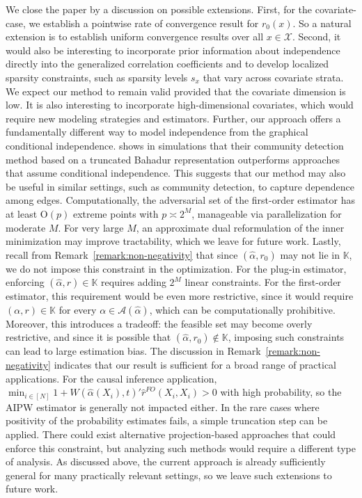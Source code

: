 \documentclass[11pt]{article}
\begin{document}
We close the paper by a discussion on possible extensions. First, for the covariate-case, we establish a pointwise rate of convergence result for $r_0(x)$. So a natural extension is to establish uniform convergence results over all $x\in\mathcal{X}$. Second, it would also be interesting to incorporate prior information about independence directly into the generalized correlation coefficients and to develop localized sparsity constraints, such as sparsity levels $s_x$ that vary across covariate strata. We expect our method to remain valid provided that the covariate dimension is low. It is also interesting to incorporate high-dimensional covariates, which would require new modeling strategies and estimators. Further, our approach offers a fundamentally different way to model independence from the graphical conditional independence. \citet{yuan2021community} shows in simulations that their community detection method based on a truncated Bahadur representation outperforms approaches that assume conditional independence. This suggests that our method may also be useful in similar settings, such as community detection, to capture dependence among edges. Computationally, the adversarial set of the first-order estimator has at least $\mathrm{O}(p)$ extreme points with $p\asymp2^M$, manageable via parallelization for moderate $M$. For very large $M$, an approximate dual reformulation of the inner minimization may improve tractability, which we leave for future work. Lastly, recall from Remark~\ref{remark:non-negativity} that since $(\hat \alpha, r_0)$ may not lie in $\mathbb{K}$, we do not impose this constraint in the optimization. For the plug-in estimator, enforcing $(\hat{\alpha},r)\in\mathbb{K}$ requires adding $2^M$ linear constraints. For the first-order estimator, this requirement would be even more restrictive, since it would require $(\alpha,r)\in\mathbb{K}$ for every $\alpha\in\mathcal{A}(\hat{\alpha})$, which can be computationally prohibitive. Moreover, this introduces a tradeoff: the feasible set may become overly restrictive, and since it is possible that $(\hat \alpha, r_0)\notin\mathbb{K}$, imposing such constraints can lead to large estimation bias. The discussion in Remark~\ref{remark:non-negativity} indicates that our result is sufficient for a broad range of practical applications. For the causal inference application, $\min_{i\in[N]}1+W(\hat{\alpha}(X_i),t)'\hat{r}^{FO}(X_i,X_i)>0$ with high probability, so the AIPW estimator is generally not impacted either. In the rare cases where positivity of the probability estimates fails, a simple truncation step can be applied. There could exist alternative projection-based approaches that could enforce this constraint, but analyzing such methods would require a different type of analysis. As discussed above, the current approach is already sufficiently general for many practically relevant settings, so we leave such extensions to future work.
\end{document}
